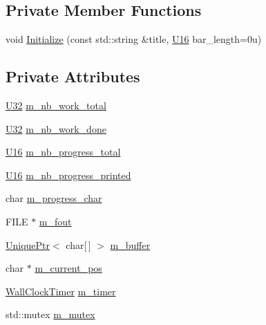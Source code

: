 \subsection*{Private Member Functions}
\begin{DoxyCompactItemize}
\item 
void \mbox{\hyperlink{classmage_1_1_progress_reporter_1_1_impl_a6d8010b76ba5c7bac97fc1dadc7fca19}{Initialize}} (const std\+::string \&title, \mbox{\hyperlink{namespacemage_af69057eec1ce005c1c3b34ae33486f16}{U16}} bar\+\_\+length=0u)
\end{DoxyCompactItemize}
\subsection*{Private Attributes}
\begin{DoxyCompactItemize}
\item 
\mbox{\hyperlink{namespacemage_a41c104c036fba3756a74e19f793eeaa1}{U32}} \mbox{\hyperlink{classmage_1_1_progress_reporter_1_1_impl_a58c67973a05cb65276612f56ff4409a6}{m\+\_\+nb\+\_\+work\+\_\+total}}
\item 
\mbox{\hyperlink{namespacemage_a41c104c036fba3756a74e19f793eeaa1}{U32}} \mbox{\hyperlink{classmage_1_1_progress_reporter_1_1_impl_ad35ff8031b2826f41912abc44dbd1d24}{m\+\_\+nb\+\_\+work\+\_\+done}}
\item 
\mbox{\hyperlink{namespacemage_af69057eec1ce005c1c3b34ae33486f16}{U16}} \mbox{\hyperlink{classmage_1_1_progress_reporter_1_1_impl_a286a47e68cdbae261b94dd238e1c9328}{m\+\_\+nb\+\_\+progress\+\_\+total}}
\item 
\mbox{\hyperlink{namespacemage_af69057eec1ce005c1c3b34ae33486f16}{U16}} \mbox{\hyperlink{classmage_1_1_progress_reporter_1_1_impl_a06efb1bb26ffbba0cd26db5df79021f8}{m\+\_\+nb\+\_\+progress\+\_\+printed}}
\item 
char \mbox{\hyperlink{classmage_1_1_progress_reporter_1_1_impl_a6796267101fa30e107ed0d5031a8dca3}{m\+\_\+progress\+\_\+char}}
\item 
F\+I\+LE $\ast$ \mbox{\hyperlink{classmage_1_1_progress_reporter_1_1_impl_a1ef149837131c4c615a4be082605f62c}{m\+\_\+fout}}
\item 
\mbox{\hyperlink{namespacemage_a3316d7143a973e37adf1110f2e80ca31}{Unique\+Ptr}}$<$ char\mbox{[}$\,$\mbox{]} $>$ \mbox{\hyperlink{classmage_1_1_progress_reporter_1_1_impl_a0ae90634d05295f7c1a8294e343418e2}{m\+\_\+buffer}}
\item 
char $\ast$ \mbox{\hyperlink{classmage_1_1_progress_reporter_1_1_impl_ab1513044548160ad7a6d181ae2618f1b}{m\+\_\+current\+\_\+pos}}
\item 
\mbox{\hyperlink{namespacemage_a06f4035ef59f07892e594bf1178a108a}{Wall\+Clock\+Timer}} \mbox{\hyperlink{classmage_1_1_progress_reporter_1_1_impl_a8eea94dc2c87abc34d80ad61b5adea2e}{m\+\_\+timer}}
\item 
std\+::mutex \mbox{\hyperlink{classmage_1_1_progress_reporter_1_1_impl_acc8b21e5c74a202b1fb8f80a26132bfc}{m\+\_\+mutex}}
\end{DoxyCompactItemize}


